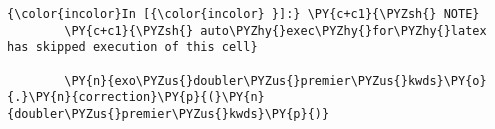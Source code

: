     \begin{Verbatim}[commandchars=\\\{\},frame=single,framerule=0.3mm,rulecolor=\color{cellframecolor}]
{\color{incolor}In [{\color{incolor} }]:} \PY{c+c1}{\PYZsh{} NOTE}
        \PY{c+c1}{\PYZsh{} auto\PYZhy{}exec\PYZhy{}for\PYZhy{}latex has skipped execution of this cell}
        
        \PY{n}{exo\PYZus{}doubler\PYZus{}premier\PYZus{}kwds}\PY{o}{.}\PY{n}{correction}\PY{p}{(}\PY{n}{doubler\PYZus{}premier\PYZus{}kwds}\PY{p}{)}
\end{Verbatim}



    
    
    
